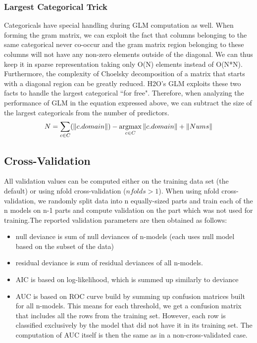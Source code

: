 \documentclass[11pt]{article}
\newcommand{\argmax}{\operatornamewithlimits{argmax}}
\begin{document}
\subsubsection{Largest Categorical Trick}
Categoricals have special handling during GLM computation as well. When forming the gram matrix, we can exploit the fact that columns belonging to the same categorical never co-occur and the gram matrix region belonging to these columns will not have any non-zero elements outside of the diagonal. We can thus keep it in sparse representation taking only O(N) elements instead of O(N*N). Furthermore, the complexity of Choelsky decomposition of a matrix that starts with a diagonal region can be greatly reduced. H2O's GLM exploits these two facts to handle the largest categorical ``for free". Therefore, when analyzing the performance of GLM in the equation expressed above, we can subtract the size of the largest categoricals from the number of predictors.
\[ N = \sum\limits_{c \in C} (\|c.domain\|) - \argmax\limits_{c \in C} \|c.domain\|  + \| Nums \| \]

\subsection{Cross-Validation}
All validation values can be computed either on the training data set (the default) or using nfold cross-validation ($nfolds > 1$). When using nfold cross-validation, we randomly split data into n equally-sized parts and train each of the n models on n-1 parts and compute validation on the part which was not used for training.The reported validation parameters are then obtained as follows:
\begin{itemize} 
\item null deviance is sum of null deviances of n-models (each uses null model based on the subset of the data)
\item residual deviance is sum of residual deviances of all n-models.
\item AIC is based on log-likelihood, which is summed up similarly to deviance
\item AUC is based on ROC curve build  by summing up confusion matrices built for all n-models.
This means for each threshold, we get a confusion matrix that includes all the rows from
the training set. However, each row is classified exclusively by the model
that did not have it in its training set. The computation of AUC itself is then the same as in a non-cross-validated case. 
\end{itemize}
\end{document}
